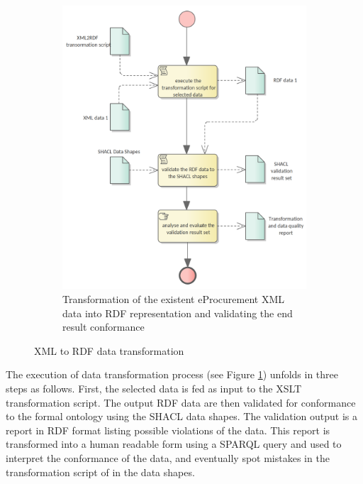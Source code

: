 \begin{figure}[!ht]
\begin{subfigure}[b]{.48\textwidth}
			\includegraphics[width=1.05\linewidth]{../img/xmlDataTransformation.png}
			\caption{Transformation of the existent eProcurement XML data into RDF representation and validating the end result conformance}
			\label{fig:sub2}
		\end{subfigure}
		\caption{XML to RDF data transformation}
		\label{fig:transformation-proc}
	\end{figure}


	The execution of data transformation process (see Figure \ref{fig:sub2}) unfolds in three steps as follows. First, the selected data is fed as input to the XSLT transformation script. The output RDF data are then validated for conformance to the formal ontology using the SHACL data shapes. The validation output is a report in RDF format listing possible violations of the data. This report is transformed into a human readable form using a SPARQL query and used to interpret the conformance of the data, and eventually spot mistakes in the transformation script of in the data shapes.   
	
